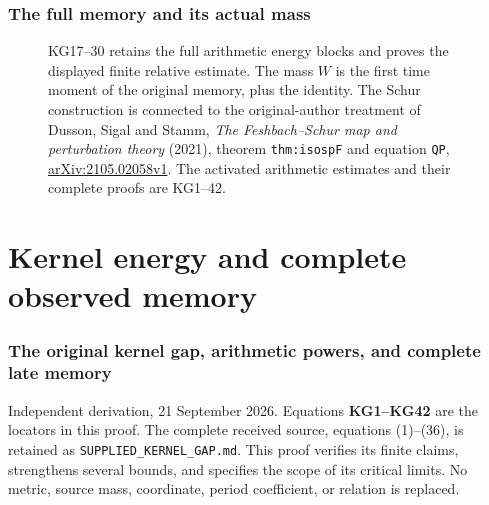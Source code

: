 \documentclass[11pt]{article}
\begin{document}
\section*{The full memory and its actual mass}
\begin{figure}[ht]\centering
{}
\caption{KG17--30 retains the full arithmetic energy blocks and
proves the displayed finite relative estimate. The mass $W$ is the
first time moment of the original memory, plus the identity.
The Schur construction is connected to the original-author treatment
of Dusson, Sigal and Stamm, \emph{The Feshbach--Schur map and
perturbation theory} (2021), theorem \texttt{thm:isospF} and
equation \texttt{QP},
\href{https://arxiv.org/abs/2105.02058v1}{arXiv:2105.02058v1}.
The activated arithmetic estimates and their complete proofs are KG1--42.}
\end{figure}\clearpage

\clearpage\part{Kernel energy and complete observed memory}
\section{The original kernel gap, arithmetic powers, and complete late memory}\label{the-original-kernel-gap-arithmetic-powers-and-complete-late-memory}

Independent derivation, 21 September 2026. Equations \textbf{KG1--KG42} are the locators in this proof. The complete received source, equations (1)--(36), is retained as \texttt{SUPPLIED\_KERNEL\_GAP.md}. This proof verifies its finite claims, strengthens several bounds, and specifies the scope of its critical limits. No metric, source mass, coordinate, period coefficient, or relation is replaced.
\end{document}

